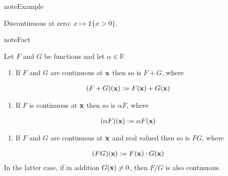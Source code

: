 \documentclass[letterpaper,10pt,english]{jupyterBook}
\begin{document}
\begin{sphinxadmonition}{note}{Example}

\sphinxAtStartPar
Discontinuous at zero: \(x \mapsto \mathbb{1}\{x > 0\}\).
\end{sphinxadmonition}

\begin{sphinxadmonition}{note}{Fact}

\sphinxAtStartPar
Let \(F\) and \(G\) be functions and let \(\alpha \in \mathbb{R}\)
\begin{enumerate}
%
\item {} 
\sphinxAtStartPar
If \(F\) and \(G\) are continuous at \({\bf x}\) then so is \(F + G\),
where

\end{enumerate}
\begin{equation*}
\begin{split}
(F + G)({\bf x}) := F({\bf x}) + G({\bf x})
\end{split}
\end{equation*}\begin{enumerate}
%
\setcounter{enumi}{1}
\item {} 
\sphinxAtStartPar
If \(F\) is continuous at \({\bf x}\) then so is \(\alpha F\), where

\end{enumerate}
\begin{equation*}
\begin{split}
(\alpha F)({\bf x}) := \alpha F({\bf x})
\end{split}
\end{equation*}\begin{enumerate}
%
\setcounter{enumi}{2}
\item {} 
\sphinxAtStartPar
If \(F\) and \(G\) are continuous at \({\bf x}\) and real valued then so is
\(FG\), where

\end{enumerate}
\begin{equation*}
\begin{split}
(FG)({\bf x}) := F({\bf x}) \cdot G({\bf x})
\end{split}
\end{equation*}
\sphinxAtStartPar
In the latter case, if in addition \(G({\bf x}) \ne 0\), then \(F/G\) is also continuous.
\end{sphinxadmonition}
\end{document}
